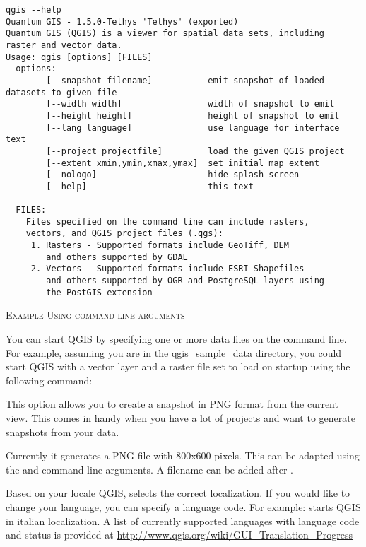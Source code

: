 \small
\begin{verbatim}
qgis --help
Quantum GIS - 1.5.0-Tethys 'Tethys' (exported)
Quantum GIS (QGIS) is a viewer for spatial data sets, including
raster and vector data.
Usage: qgis [options] [FILES]
  options:
        [--snapshot filename]           emit snapshot of loaded datasets to given file
        [--width width]                 width of snapshot to emit
        [--height height]               height of snapshot to emit
        [--lang language]               use language for interface text
        [--project projectfile]         load the given QGIS project
        [--extent xmin,ymin,xmax,ymax]  set initial map extent
        [--nologo]                      hide splash screen
        [--help]                        this text

  FILES:
    Files specified on the command line can include rasters,
    vectors, and QGIS project files (.qgs):
     1. Rasters - Supported formats include GeoTiff, DEM
        and others supported by GDAL
     2. Vectors - Supported formats include ESRI Shapefiles
        and others supported by OGR and PostgreSQL layers using
        the PostGIS extension
\end{verbatim}
\normalsize

\begin{Tip} \caption{\textsc{Example Using command line arguments}}
You can start QGIS by specifying one or more data files
on the command line. For example, assuming you are in the
qgis\_sample\_data directory, you could start QGIS with a vector layer
and a raster file set to load on startup using the following command:
\end{Tip}

This option allows you to create a snapshot in PNG format from the current view.
This comes in handy when you have a lot of projects and want to
generate snapshots from your data.

Currently it generates a PNG-file with 800x600 pixels. This can be adapted
using the  and  command line
arguments. A filename can be added after .

Based on your locale QGIS, selects the correct localization. If you would like
to change your language, you can specify a language code. For example:
starts QGIS in italian localization. A list of currently supported
languages with language code and status is provided at
\url{http://www.qgis.org/wiki/GUI_Translation_Progress}

